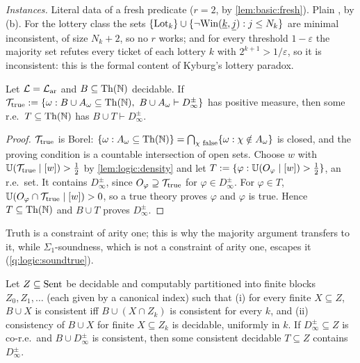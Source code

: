\emph{Instances.} Literal data of a fresh predicate ($r=2$, by \cref{lem:basic:fresh}). Plain \SOIabbr, by (b). For the lottery class the sets $\{\mathrm{Lot}_k\}\cup\{\neg\mathrm{Win}(\underline{k},\underline{j}):j\le N_k\}$ are minimal inconsistent, of size $N_k+2$, so no $r$ works; and for every threshold $1-\varepsilon$ the majority set refutes every ticket of each lottery $k$ with $2^{k+1}>1/\varepsilon$, so it is inconsistent: this is the formal content of Kyburg's lottery paradox.

\begin{proposition}\label{prop:logic:true}
Let $\mathcal L=\mathcal{L}_{\mathrm{ar}}$ and $B\subseteq\mathrm{Th}(\mathbb N)$ decidable. If $\mathcal T_{\rm true}:=\{\omega:B\cup A_\omega\subseteq\mathrm{Th}(\mathbb N),\ B\cup A_\omega\vdash D_\infty^\pm\}$ has positive measure, then some r.e.\ $T\subseteq\mathrm{Th}(\mathbb N)$ has $B\cup T\vdash D_\infty^\pm$.
\end{proposition}

\begin{proof}
$\mathcal T_{\rm true}$ is Borel: $\{\omega:A_\omega\subseteq\mathrm{Th}(\mathbb N)\}=\bigcap_{\chi\text{ false}}\{\omega:\chi\notin A_\omega\}$ is closed, and the proving condition is a countable intersection of open sets. Choose $w$ with $\mathbb{U}(\mathcal T_{\rm true}\mid[w])>\frac12$ by \cref{lem:logic:density} and let $T:=\{\varphi:\mathbb{U}(O_\varphi\mid[w])>\frac12\}$, an r.e.\ set. It contains $D_\infty^\pm$, since $O_\varphi\supseteq\mathcal T_{\rm true}$ for $\varphi\in D_\infty^\pm$. For $\varphi\in T$, $\mathbb{U}(O_\varphi\cap\mathcal T_{\rm true}\mid[w])>0$, so a true theory proves $\varphi$ and $\varphi$ is true. Hence $T\subseteq\mathrm{Th}(\mathbb N)$ and $B\cup T$ proves $D_\infty^\pm$.
\end{proof}

Truth is a constraint of arity one; this is why the majority argument transfers to it, while $\Sigma_1$-soundness, which is not a constraint of arity one, escapes it (\cref{q:logic:soundtrue}).

\begin{proposition}\label{prop:logic:core}
Let $Z\subseteq\mathrm{Sent}$ be decidable and computably partitioned into finite blocks $Z_0,Z_1,\dots$ (each given by a canonical index) such that (i) for every finite $X\subseteq Z$, $B\cup X$ is consistent iff $B\cup(X\cap Z_k)$ is consistent for every $k$, and (ii) consistency of $B\cup X$ for finite $X\subseteq Z_k$ is decidable, uniformly in $k$. If $D_\infty^\pm\subseteq Z$ is co-r.e.\ and $B\cup D_\infty^\pm$ is consistent, then some consistent decidable $T\subseteq Z$ contains $D_\infty^\pm$.
\end{proposition}

